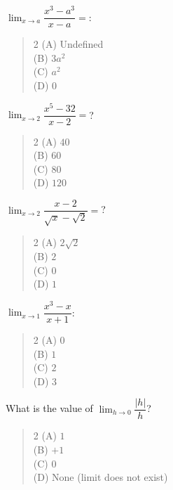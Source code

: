 \documentclass[11pt,a4paper]{article}
\begin{document}
\begin{mcqlist}
\item $\displaystyle\lim_{x\to a}\dfrac{x^3-a^3}{x-a} = $:
\begin{quote}\begin{multicols}{2}
\noindent (A) Undefined \\
(B) $3a^2$ \\
(C) $a^2$ \\
(D) $0$
\end{multicols}\end{quote}

\item $\displaystyle\lim_{x\to2}\dfrac{x^5-32}{x-2} = $?
\begin{quote}\begin{multicols}{2}
\noindent (A) $40$ \\
(B) $60$ \\
(C) $80$ \\
(D) $120$
\end{multicols}\end{quote}

\item $\displaystyle\lim_{x\to2}\dfrac{x-2}{\sqrt{x}-\sqrt{2}} = $?
\begin{quote}\begin{multicols}{2}
\noindent (A) $2\sqrt{2}$ \\
(B) $2$ \\
(C) $0$ \\
(D) $1$
\end{multicols}\end{quote}

\item $\displaystyle\lim_{x\to1}\dfrac{x^3-x}{x+1}$:
\begin{quote}\begin{multicols}{2}
\noindent (A) $0$ \\
(B) $1$ \\
(C) $2$ \\
(D) $3$
\end{multicols}\end{quote}

\item What is the value of $\displaystyle\lim_{h\to0}\dfrac{|h|}{h}$?
\begin{quote}\begin{multicols}{2}
\noindent (A) $1$ \\
(B) $+1$ \\
(C) $0$ \\
(D) None (limit does not exist)
\end{multicols}\end{quote}


\end{mcqlist}
\end{document}
